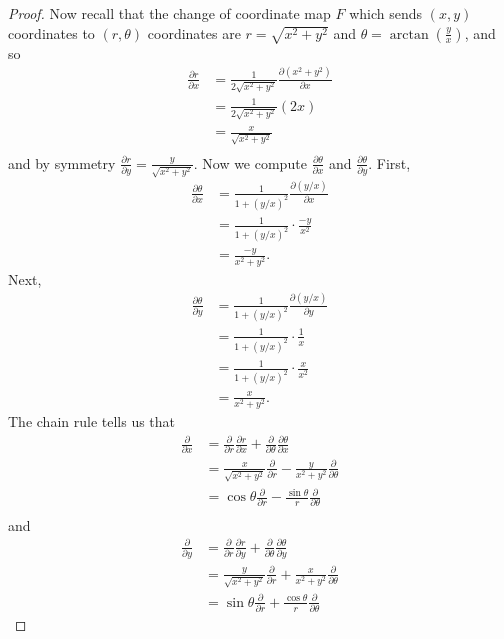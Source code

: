 \documentclass{article}
\begin{document}
\begin{enumerate}
\begin{proof}
		
		Now recall that the change of coordinate map $F$ which sends $(x,y)$ coordinates to $(r, \theta)$ coordinates are $r = \sqrt{x^2+y^2}$ and $\theta = \arctan(\frac{y}{x})$, and so
		\begin{align*}
			\frac{\partial r}{\partial x} &= \frac{1}{2 \sqrt{x^2+y^2}} \frac{\partial (x^2+y^2)}{\partial x}\\
			&= \frac{1}{2 \sqrt{x^2+y^2}} (2x) \\
			&= \frac{x}{ \sqrt{x^2+y^2}} \\
		\end{align*}
		and by symmetry $\frac{\partial r}{\partial y} = \frac{y}{ \sqrt{x^2+y^2}} $.
		Now we compute $\frac{\partial \theta}{\partial x}$ and $\frac{\partial \theta}{ \partial y}$.
		First,
		\begin{align*}
			\frac{\partial \theta}{\partial x} &= \frac{1}{1+(y/x)^2}\frac{\partial (y/x)}{\partial x} \\
			&=\frac{1}{1+(y/x)^2} \cdot \frac{-y}{x^2}\\
			&=\frac{-y}{x^2+y^2}.
		\end{align*}
		Next,
		\begin{align*}
			\frac{\partial \theta}{\partial y} &= \frac{1}{1+(y/x)^2}\frac{\partial (y/x)}{\partial y} \\
			&=\frac{1}{1+(y/x)^2} \cdot \frac{1}{x}\\
			&=\frac{1}{1+(y/x)^2} \cdot \frac{x}{x^2}\\
			&=\frac{x}{x^2+y^2}. 		
		\end{align*}
%
		The chain rule tells us that
		\begin{align*}
			 \frac{\partial}{\partial x} &= \frac{\partial }{\partial r} \frac{\partial r}{\partial x} + \frac{\partial }{\partial \theta} \frac{\partial \theta}{\partial x}  \\
			 &= \frac{x}{\sqrt{x^2+y^2}} \frac{\partial }{\partial r}  - \frac{y}{x^2+y^2}\frac{\partial }{\partial \theta}\\
			 &= \cos \theta  \frac{\partial }{\partial r}  - \frac{\sin \theta}{r}\frac{\partial }{\partial \theta}\\
		\end{align*}
		and
		\begin{align*}
			 \frac{\partial}{\partial y} &= \frac{\partial }{\partial r} \frac{\partial r}{\partial y} + \frac{\partial }{\partial \theta} \frac{\partial \theta}{\partial y} \\
			 &=  \frac{y}{\sqrt{x^2+y^2}}\frac{\partial }{\partial r}  + \frac{x}{x^2+y^2}\frac{\partial }{\partial \theta}\\
			 &= \sin \theta \frac{\partial}{\partial r} + \frac{\cos \theta}{r} \frac{\partial}{\partial \theta}
		\end{align*}
		

\end{proof}
\end{enumerate}
\end{document}
